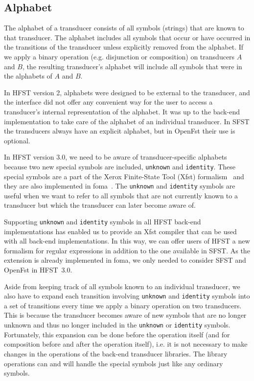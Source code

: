\documentclass{llncs}
\begin{document}
\subsection{Alphabet}
The alphabet of a transducer consists of all symbols (strings) that are
known to that transducer. The alphabet includes all symbols that occur 
or have occurred in the transitions of the transducer unless explicitly
removed from the alphabet. 
If we apply a binary operation (e.g. disjunction or composition) on 
transducers $A$ and $B$, the resulting transducer's alphabet will include
all symbols that were in the alphabets of $A$ and $B$. 

In HFST version 2, alphabets were designed to be external to the transducer,
and the interface did not offer any convenient way for the user to access a 
transducer's internal representation of the alphabet. It was up to the back-end 
implementation to take care of the alphabet of an individual transducer. In SFST 
the transducers always have an explicit alphabet, but in OpenFst their use is optional.
 
In HFST version 3.0, we need to be aware of transducer-specific alphabets 
because two new special symbols are included, \texttt{unknown} and \texttt{identity}. 
These special symbols are a part of the Xerox Finite-State Tool (Xfst) 
formalism~\cite{beesley/2003} and they are also implemented in
foma~\cite{hulden/2009}. The \texttt{unknown} and \texttt{identity} symbols 
are useful when we want to refer to all symbols that are not currently 
known to a transducer but which the transducer can later become aware of. 

Supporting \texttt{unknown} and \texttt{identity} symbols in all HFST back-end
implementations has enabled us to provide an Xfst compiler that can be used
with all back-end implementations. 
In this way, we can offer users of HFST a new 
formalism for regular expressions in addition to the one available in SFST. 
As the extension is already implemented in foma, we only needed to 
consider SFST and OpenFst in HFST~3.0.

Aside from keeping track of all symbols known to an individual transducer, we also
have to expand each transition involving \texttt{unknown} and 
\texttt{identity} symbols into a set of transitions every time we apply 
a binary operation on two transducers. 
This is because the transducer becomes aware of new symbols that are
no longer unknown and thus no longer included in the \texttt{unknown} or 
\texttt{identity} symbols.
Fortunately, this expansion can be done before the operation itself 
(and for composition before and after the operation itself), i.e. it is  
not necessary to make changes in the operations of the back-end transducer
libraries. 
The library operations can and will handle the special symbols just
like any ordinary symbols. 
\end{document}
